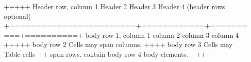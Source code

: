 \documentclass[letterpaper,12pt,english]{sphinxmanual}
\begin{document}
\begin{sphinxVerbatim}[commandchars=\\\{\}]
+\PYGZhy{}\PYGZhy{}\PYGZhy{}\PYGZhy{}\PYGZhy{}\PYGZhy{}\PYGZhy{}\PYGZhy{}\PYGZhy{}\PYGZhy{}\PYGZhy{}\PYGZhy{}\PYGZhy{}\PYGZhy{}\PYGZhy{}\PYGZhy{}\PYGZhy{}\PYGZhy{}\PYGZhy{}\PYGZhy{}\PYGZhy{}\PYGZhy{}\PYGZhy{}\PYGZhy{}+\PYGZhy{}\PYGZhy{}\PYGZhy{}\PYGZhy{}\PYGZhy{}\PYGZhy{}\PYGZhy{}\PYGZhy{}\PYGZhy{}\PYGZhy{}\PYGZhy{}\PYGZhy{}+\PYGZhy{}\PYGZhy{}\PYGZhy{}\PYGZhy{}\PYGZhy{}\PYGZhy{}\PYGZhy{}\PYGZhy{}\PYGZhy{}\PYGZhy{}+\PYGZhy{}\PYGZhy{}\PYGZhy{}\PYGZhy{}\PYGZhy{}\PYGZhy{}\PYGZhy{}\PYGZhy{}\PYGZhy{}\PYGZhy{}+
 Header row, column 1   \textbar{} Header 2   \textbar{} Header 3 \textbar{} Header 4 \textbar{}
 (header rows optional) \textbar{}            \textbar{}          \textbar{}          \textbar{}
+========================+============+==========+==========+
 body row 1, column 1   \textbar{} column 2   \textbar{} column 3 \textbar{} column 4 \textbar{}
+\PYGZhy{}\PYGZhy{}\PYGZhy{}\PYGZhy{}\PYGZhy{}\PYGZhy{}\PYGZhy{}\PYGZhy{}\PYGZhy{}\PYGZhy{}\PYGZhy{}\PYGZhy{}\PYGZhy{}\PYGZhy{}\PYGZhy{}\PYGZhy{}\PYGZhy{}\PYGZhy{}\PYGZhy{}\PYGZhy{}\PYGZhy{}\PYGZhy{}\PYGZhy{}\PYGZhy{}+\PYGZhy{}\PYGZhy{}\PYGZhy{}\PYGZhy{}\PYGZhy{}\PYGZhy{}\PYGZhy{}\PYGZhy{}\PYGZhy{}\PYGZhy{}\PYGZhy{}\PYGZhy{}+\PYGZhy{}\PYGZhy{}\PYGZhy{}\PYGZhy{}\PYGZhy{}\PYGZhy{}\PYGZhy{}\PYGZhy{}\PYGZhy{}\PYGZhy{}+\PYGZhy{}\PYGZhy{}\PYGZhy{}\PYGZhy{}\PYGZhy{}\PYGZhy{}\PYGZhy{}\PYGZhy{}\PYGZhy{}\PYGZhy{}+
 body row 2             \textbar{} Cells may span columns.          \textbar{}
+\PYGZhy{}\PYGZhy{}\PYGZhy{}\PYGZhy{}\PYGZhy{}\PYGZhy{}\PYGZhy{}\PYGZhy{}\PYGZhy{}\PYGZhy{}\PYGZhy{}\PYGZhy{}\PYGZhy{}\PYGZhy{}\PYGZhy{}\PYGZhy{}\PYGZhy{}\PYGZhy{}\PYGZhy{}\PYGZhy{}\PYGZhy{}\PYGZhy{}\PYGZhy{}\PYGZhy{}+\PYGZhy{}\PYGZhy{}\PYGZhy{}\PYGZhy{}\PYGZhy{}\PYGZhy{}\PYGZhy{}\PYGZhy{}\PYGZhy{}\PYGZhy{}\PYGZhy{}\PYGZhy{}+\PYGZhy{}\PYGZhy{}\PYGZhy{}\PYGZhy{}\PYGZhy{}\PYGZhy{}\PYGZhy{}\PYGZhy{}\PYGZhy{}\PYGZhy{}\PYGZhy{}\PYGZhy{}\PYGZhy{}\PYGZhy{}\PYGZhy{}\PYGZhy{}\PYGZhy{}\PYGZhy{}\PYGZhy{}\PYGZhy{}\PYGZhy{}+
 body row 3             \textbar{} Cells may  \textbar{} \PYGZhy{} Table cells       \textbar{}
+\PYGZhy{}\PYGZhy{}\PYGZhy{}\PYGZhy{}\PYGZhy{}\PYGZhy{}\PYGZhy{}\PYGZhy{}\PYGZhy{}\PYGZhy{}\PYGZhy{}\PYGZhy{}\PYGZhy{}\PYGZhy{}\PYGZhy{}\PYGZhy{}\PYGZhy{}\PYGZhy{}\PYGZhy{}\PYGZhy{}\PYGZhy{}\PYGZhy{}\PYGZhy{}\PYGZhy{}+ span rows. \textbar{} \PYGZhy{} contain           \textbar{}
 body row 4             \textbar{}            \textbar{} \PYGZhy{} body elements.    \textbar{}
+\PYGZhy{}\PYGZhy{}\PYGZhy{}\PYGZhy{}\PYGZhy{}\PYGZhy{}\PYGZhy{}\PYGZhy{}\PYGZhy{}\PYGZhy{}\PYGZhy{}\PYGZhy{}\PYGZhy{}\PYGZhy{}\PYGZhy{}\PYGZhy{}\PYGZhy{}\PYGZhy{}\PYGZhy{}\PYGZhy{}\PYGZhy{}\PYGZhy{}\PYGZhy{}\PYGZhy{}+\PYGZhy{}\PYGZhy{}\PYGZhy{}\PYGZhy{}\PYGZhy{}\PYGZhy{}\PYGZhy{}\PYGZhy{}\PYGZhy{}\PYGZhy{}\PYGZhy{}\PYGZhy{}+\PYGZhy{}\PYGZhy{}\PYGZhy{}\PYGZhy{}\PYGZhy{}\PYGZhy{}\PYGZhy{}\PYGZhy{}\PYGZhy{}\PYGZhy{}\PYGZhy{}\PYGZhy{}\PYGZhy{}\PYGZhy{}\PYGZhy{}\PYGZhy{}\PYGZhy{}\PYGZhy{}\PYGZhy{}\PYGZhy{}\PYGZhy{}+
\end{sphinxVerbatim}
\end{document}
